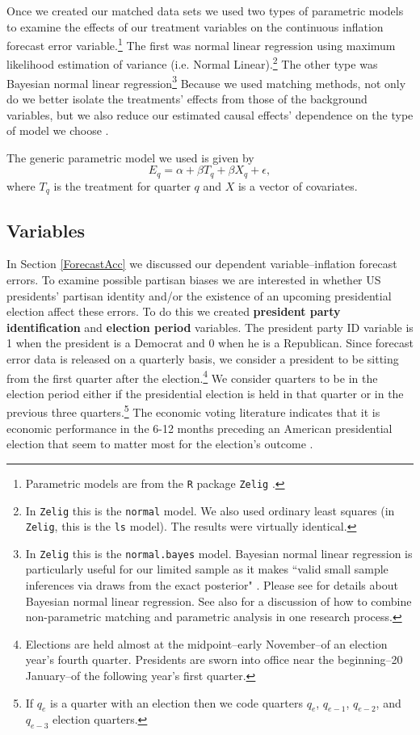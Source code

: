 \documentclass[a4paper]{article}\usepackage{graphicx, color}
\begin{document}
Once we created our matched data sets we used two types of parametric models to examine the effects of our treatment variables on the continuous inflation forecast error variable.\footnote{Parametric models are from the \texttt{R} package \texttt{Zelig} \citep{Zelig2012}.} The first was normal linear regression using maximum likelihood estimation of variance (i.e. Normal Linear).\footnote{In {\tt{Zelig}} this is the {\tt{normal}} model. We also used ordinary least squares (in \texttt{Zelig}, this is the \texttt{ls} model). The results were virtually identical.} The other type was Bayesian normal linear regression\footnote{In {\tt{Zelig}} this is the {\tt{normal.bayes}} model. Bayesian normal linear regression is particularly useful for our limited sample as it makes ``valid small sample inferences via draws from the exact posterior" \citep[][38]{Zelig2012}. Please see \cite{Goodrich2007} for details about Bayesian normal linear regression.  See also \cite{Imai2008} for a discussion of how to combine non-parametric matching and parametric analysis in one research process.} Because we used  matching methods, not only do we better isolate the treatments' effects from those of the background variables, but we also reduce our estimated causal effects' dependence on the type of model we choose \cite[200--201]{Ho2007}.

The generic parametric model we used is given by
%
\begin{equation}
    E_{q} = \alpha + \beta T_{q} + \beta X_{q} + \epsilon,
\end{equation}
%
where $T_{q}$ is the treatment for quarter $q$ and $X$ is a vector of covariates. 

\subsection{Variables}

In Section \ref{ForecastAcc} we discussed our dependent variable--inflation forecast errors. To examine possible partisan biases we are interested in whether US presidents' partisan identity and/or the existence of an upcoming presidential election affect these errors. To do this we created {\bf{president party identification}} and {\bf{election period}} variables. The president party ID variable is 1 when the president is a Democrat and 0 when he is a Republican. Since forecast error data is released on a quarterly basis, we consider a president to be sitting from the first quarter after the election.\footnote{Elections are held almost at the midpoint--early November--of an election year's fourth quarter. Presidents are sworn into office near the beginning--20 January--of the following year's first quarter.} We consider quarters to be in the election period either if the presidential election is held in that quarter or in the previous three quarters.\footnote{If $q_{e}$ is a quarter with an election then we code quarters $q_{e}$, $q_{e-1}$, $q_{e-2}$, and $q_{e-3}$  election quarters.} The economic voting literature indicates that it is economic performance in the 6-12 months preceding an American presidential election that seem to matter most for the election's outcome \citep[c.f]{Gelman1993}. 
\end{document}
